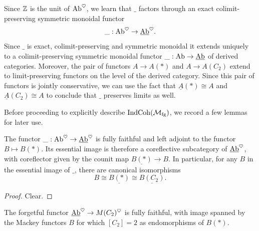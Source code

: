 \begin{rmk} \label{rmk:underline}
  Since $\mathbb{Z}$ is the unit of $\mathrm{Ab}^{\heartsuit}$, we learn that $\_$ factors through an exact colimit-preserving symmetric monoidal functor%
  \[\_ : \mathrm{Ab}^{\heartsuit} \to \underline{\mathrm{Ab}}^{\heartsuit}.\]
  Since $\_$ is exact, colimit-preserving and symmetric monoidal it extends uniquely to a colimit-preserving symmetric monoidal functor $\_ : \mathrm{Ab} \to \underline{\mathrm{Ab}}$ of derived categories. Moreover, the pair of functors $A \to A(*)$ and $A \to A(C_2)$ extend to limit-preserving functors on the level of the derived category. Since this pair of functors is jointly conservative, we can use the fact that $\underline{A}(*) \cong A$ and $\underline{A}(C_2) \cong A$ to conclude that $\_$ preserves limits as well.
 
\end{rmk}

Before proceeding to explicitly describe $\mathrm{IndCoh}(\mathcal{M}_{\mathrm{fg}})$, we record a few lemmas for later use. 

\begin{lem} \label{lem:const-mackey}
  The functor $\_ : \mathrm{Ab}^{\heartsuit} \to \underline{\mathrm{Ab}}^{\heartsuit}$ is fully faithful and left adjoint to the functor
  $B \mapsto B(\ast)$.
  Its essential image is therefore a coreflective subcategory of $\underline{\mathrm{Ab}}^{\heartsuit}$, with coreflector given by the counit map $\underline{B(\ast)} \to B$.
  In particular, for any $B$ in the essential image of $\_$, there are canonical isomorphisms
  \[B \cong \underline{B(\ast)} \cong \underline{B(C_2)}.\]
\end{lem}

\begin{proof} Clear.
\end{proof}

\begin{lem} \label{lem:uabh-image}
  The forgetful functor $\underline{\mathrm{Ab}}^{\heartsuit} \to M(C_2)^{\heartsuit}$ is fully faithful, with image spanned by the Mackey functors $B$ for which $[C_2]=2$ as endomorphisms of $B(\ast)$.
\end{lem}

